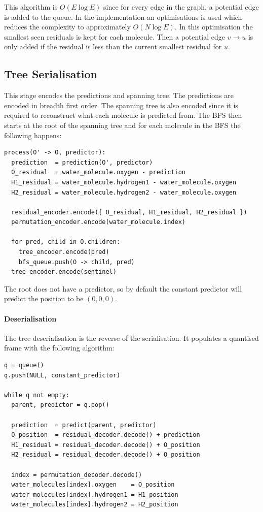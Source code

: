 \documentclass[a4paper]{report}
\begin{document}
This algorithm is $O(E \log E)$ since for every edge in the graph, a potential
edge is added to the queue. In the implementation an optimisations is used
which reduces the complexity to approximately $O(N \log E)$. In this
optimisation the smallest seen residuals is kept for each molecule. Then a
potential edge $v \to u$ is only added if the residual is less than the
current smallest residual for $u$.


\subsection{Tree Serialisation}

This stage encodes the predictions and spanning tree. The predictions are
encoded in breadth first order. The spanning tree is also encoded since it is
required to reconstruct what each molecule is predicted from. The BFS then
starts at the root of the spanning tree and for each molecule in the BFS the
following happens:

\begin{verbatim}
process(O' -> O, predictor):
  prediction  = prediction(O', predictor)
  O_residual  = water_molecule.oxygen - prediction
  H1_residual = water_molecule.hydrogen1 - water_molecule.oxygen
  H2_residual = water_molecule.hydrogen2 - water_molecule.oxygen

  residual_encoder.encode({ O_residual, H1_residual, H2_residual })
  permutation_encoder.encode(water_molecule.index)

  for pred, child in O.children:
    tree_encoder.encode(pred)
    bfs_queue.push(O -> child, pred)
  tree_encoder.encode(sentinel)
\end{verbatim}

The root does not have a predictor, so by default the constant predictor will
predict the position to be $(0,0,0)$.


\paragraph{Deserialisation}

The tree deserialisation is the reverse of the serialisation. It populates a
quantised frame with the following algorithm:

\begin{verbatim}
q = queue()
q.push(NULL, constant_predictor)

while q not empty:
  parent, predictor = q.pop()

  prediction  = predict(parent, predictor)
  O_position  = residual_decoder.decode() + prediction
  H1_residual = residual_decoder.decode() + O_position
  H2_residual = residual_decoder.decode() + O_position

  index = permutation_decoder.decode()
  water_molecules[index].oxygen    = O_position
  water_molecules[index].hydrogen1 = H1_position
  water_molecules[index].hydrogen2 = H2_position
\end{verbatim}
\end{document}
